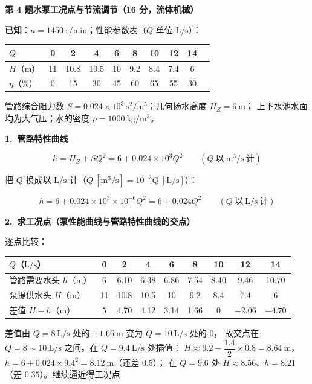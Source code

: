 \noindent\textbf{第 4 题\quad 水泵工况点与节流调节（16 分，流体机械）}

\begin{jie}
\textbf{已知}：$n=1450\ \mathrm{r/min}$；性能参数表（$Q$ 单位 $\mathrm{L/s}$）：

\begin{center}
\begin{tabular}{@{}lccccccccc@{}}
\toprule
$Q$ & 0 & 2 & 4 & 6 & 8 & 10 & 12 & 14 \\
\midrule
$H$（$\mathrm{m}$） & 11 & 10.8 & 10.5 & 10 & 9.2 & 8.4 & 7.4 & 6 \\
$\eta$（\%） & 0 & 15 & 30 & 45 & 60 & 65 & 55 & 30 \\
\bottomrule
\end{tabular}
\end{center}

管路综合阻力数 $S=0.024\times10^{3}\ \mathrm{s^2/m^5}$；几何扬水高度 $H_Z=6\ \mathrm{m}$；
上下水池水面均为大气压；水的密度 $\rho=1000\ \mathrm{kg/m^3}$。

\textbf{1.\ 管路特性曲线}

\[ h=H_Z+SQ^2=6+0.024\times10^{3}Q^2 \qquad (Q\ \text{以}\ \mathrm{m^3/s}\ \text{计}) \]

把 $Q$ 换成以 $\mathrm{L/s}$ 计（$Q\ [\mathrm{m^3/s}]=10^{-3}Q\ [\mathrm{L/s}]$）：

\[ h=6+0.024\times10^{3}\times10^{-6}Q^2=6+0.024Q^2 \qquad (Q\ \text{以}\ \mathrm{L/s}\ \text{计}) \]

\textbf{2.\ 求工况点（泵性能曲线与管路特性曲线的交点）}

逐点比较：

\begin{center}
\begin{tabular}{@{}lcccccccc@{}}
\toprule
$Q$（$\mathrm{L/s}$） & 0 & 2 & 4 & 6 & 8 & 10 & 12 & 14 \\
\midrule
管路需要水头 $h$（$\mathrm{m}$） & 6 & 6.10 & 6.38 & 6.86 & 7.54 & 8.40 & 9.46 & 10.70 \\
泵提供水头 $H$（$\mathrm{m}$） & 11 & 10.8 & 10.5 & 10 & 9.2 & 8.4 & 7.4 & 6 \\
\midrule
差值 $H-h$（$\mathrm{m}$） & 5 & 4.70 & 4.12 & 3.14 & 1.66 & 0 & $-2.06$ & $-4.70$ \\
\bottomrule
\end{tabular}
\end{center}

差值由 $Q=8\ \mathrm{L/s}$ 处的 $+1.66\ \mathrm{m}$ 变为 $Q=10\ \mathrm{L/s}$ 处的 $0$，
故交点在 $Q=8\sim10\ \mathrm{L/s}$ 之间。在 $Q=9.4\ \mathrm{L/s}$ 处插值：
$H\approx9.2-\dfrac{1.4}{2}\times0.8=8.64\ \mathrm{m}$，$h=6+0.024\times9.4^2=8.12\ \mathrm{m}$（还差 $0.5$）；
在 $Q=9.6$ 处 $H\approx8.56$、$h=8.21$（差 $0.35$）。继续逼近得工况点


\end{jie}

